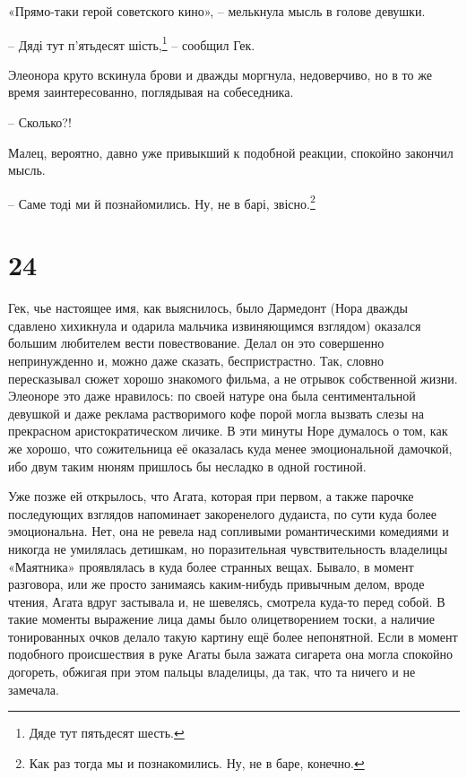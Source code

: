 \documentclass[
  a5paperpaper,
  DIV=11,
  numbers=noendperiod]{scrreprt}
\begin{document}
«Прямо-таки герой советского кино», -- мелькнула мысль в голове девушки.

-- Дяді тут п'ятьдесят шість,\footnote{Дяде тут пятьдесят шесть.} --
сообщил Гек.

Элеонора круто вскинула брови и дважды моргнула, недоверчиво, но в то же
время заинтересованно, поглядывая на собеседника.

-- Сколько?!

Малец, вероятно, давно уже привыкший к подобной реакции, спокойно
закончил мысль.

-- Саме тоді ми й познайомились. Ну, не в барі, звісно.\footnote{Как раз
  тогда мы и познакомились. Ну, не в баре, конечно.}

\section*{24}\label{24}


Гек, чье настоящее имя, как выяснилось, было Дармедонт (Нора дважды
сдавлено хихикнула и одарила мальчика извиняющимся взглядом) оказался
большим любителем вести повествование. Делал он это совершенно
непринужденно и, можно даже сказать, беспристрастно. Так, словно
пересказывал сюжет хорошо знакомого фильма, а не отрывок собственной
жизни. Элеоноре это даже нравилось: по своей натуре она была
сентиментальной девушкой и даже реклама растворимого кофе порой могла
вызвать слезы на прекрасном аристократическом личике. В эти минуты Норе
думалось о том, как же хорошо, что сожительница её оказалась куда менее
эмоциональной дамочкой, ибо двум таким нюням пришлось бы несладко в
одной гостиной.

Уже позже ей открылось, что Агата, которая при первом, а также парочке
последующих взглядов напоминает закоренелого дудаиста, по сути куда
более эмоциональна. Нет, она не ревела над сопливыми романтическими
комедиями и никогда не умилялась детишкам, но поразительная
чувствительность владелицы «Маятника» проявлялась в куда более странных
вещах. Бывало, в момент разговора, или же просто занимаясь каким-нибудь
привычным делом, вроде чтения, Агата вдруг застывала и, не шевелясь,
смотрела куда-то перед собой. В такие моменты выражение лица дамы было
олицетворением тоски, а наличие тонированных очков делало такую картину
ещё более непонятной. Если в момент подобного происшествия в руке Агаты
была зажата сигарета она могла спокойно догореть, обжигая при этом
пальцы владелицы, да так, что та ничего и не замечала.
\end{document}
